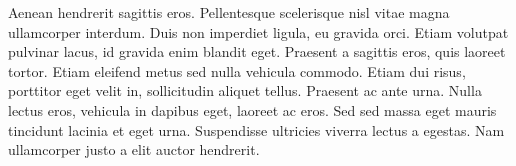 \documentclass[11pt]{amsart}
\begin{document}
Aenean hendrerit sagittis eros. Pellentesque scelerisque nisl vitae magna ullamcorper interdum. Duis non imperdiet ligula, eu gravida orci. Etiam volutpat pulvinar lacus, id gravida enim blandit eget. Praesent a sagittis eros, quis laoreet tortor. Etiam eleifend metus sed nulla vehicula commodo. Etiam dui risus, porttitor eget velit in, sollicitudin aliquet tellus. Praesent ac ante urna. Nulla lectus eros, vehicula in dapibus eget, laoreet ac eros. Sed sed massa eget mauris tincidunt lacinia et eget urna. Suspendisse ultricies viverra lectus a egestas. Nam ullamcorper justo a elit auctor hendrerit.
\end{document}
